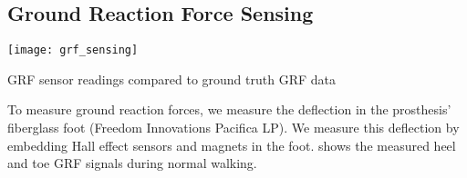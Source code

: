 \subsection{Ground Reaction Force Sensing}\label{sec:mech_design_grf}

\begin{marginfigure}[0.0in]
    \centering 
    \texttt{[image: grf\_sensing]}
    \caption{GRF sensor readings compared to ground truth GRF
    data}\label{fig:grf_sensing}
\end{marginfigure}
To measure ground reaction forces, we measure the deflection in the prosthesis'
fiberglass foot (Freedom Innovations Pacifica LP). We measure this deflection by
embedding Hall effect sensors and magnets in the foot. 
shows the measured heel and toe GRF signals during normal walking.
